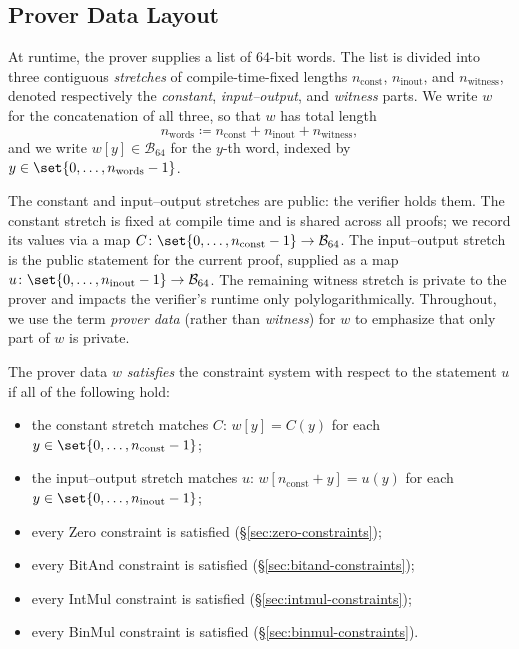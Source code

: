 \documentclass{article}
\theoremstyle{definition}
\newcommand{\BB}{\mathcal{B}}
\begin{document}
\subsection{Prover Data Layout}
\label{sec:prover-data}

At runtime, the prover supplies a list of $64$-bit words. The list is divided into three contiguous \emph{stretches} of compile-time-fixed lengths $n_\text{const}$, $n_\text{inout}$, and $n_\text{witness}$, denoted respectively the \emph{constant}, \emph{input--output}, and \emph{witness} parts. We write $w$ for the concatenation of all three, so that $w$ has total length
\[
  n_\text{words} \coloneqq n_\text{const} + n_\text{inout} + n_\text{witness},
\]
and we write $w[y] \in \BB_{64}$ for the $y$-th word, indexed by $y \in \set{0, \ldots, n_\text{words} - 1}$.

The constant and input--output stretches are public: the verifier holds them. The constant stretch is fixed at compile time and is shared across all proofs; we record its values via a map $C \colon \set{0, \ldots, n_\text{const} - 1} \to \BB_{64}$. The input--output stretch is the public statement for the current proof, supplied as a map $u \colon \set{0, \ldots, n_\text{inout} - 1} \to \BB_{64}$. The remaining witness stretch is private to the prover and impacts the verifier's runtime only polylogarithmically. Throughout, we use the term \emph{prover data} (rather than \emph{witness}) for $w$ to emphasize that only part of $w$ is private.

The prover data $w$ \emph{satisfies} the constraint system with respect to the statement $u$ if all of the following hold:
\begin{itemize}
\item the constant stretch matches $C$: $w[y] = C(y)$ for each $y \in \set{0, \ldots, n_\text{const} - 1}$;
\item the input--output stretch matches $u$: $w[n_\text{const} + y] = u(y)$ for each $y \in \set{0, \ldots, n_\text{inout} - 1}$;
\item every Zero constraint is satisfied (\S\ref{sec:zero-constraints});
\item every BitAnd constraint is satisfied (\S\ref{sec:bitand-constraints});
\item every IntMul constraint is satisfied (\S\ref{sec:intmul-constraints});
\item every BinMul constraint is satisfied (\S\ref{sec:binmul-constraints}).
\end{itemize}
\end{document}
